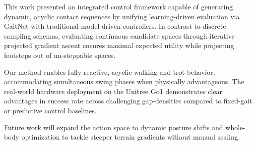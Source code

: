 This work presented an integrated control framework capable of generating dynamic, acyclic contact sequences by unifying learning-driven evaluation via GaitNet with traditional model-driven controllers. In contrast to discrete sampling schemas, evaluating continuous candidate spaces through iterative projected gradient ascent ensures maximal expected utility while projecting footsteps out of un-steppable spaces.

Our method enables fully reactive, acyclic walking and trot behavior, accommodating simultaneous swing phases when physically advantageous. The real-world hardware deployment on the Unitree Go1 demonstrates clear advantages in success rate across challenging gap-densities compared to fixed-gait or predictive control baselines. 

Future work will expand the action space to dynamic posture shifts and whole-body optimization to tackle steeper terrain gradients without manual scaling.
